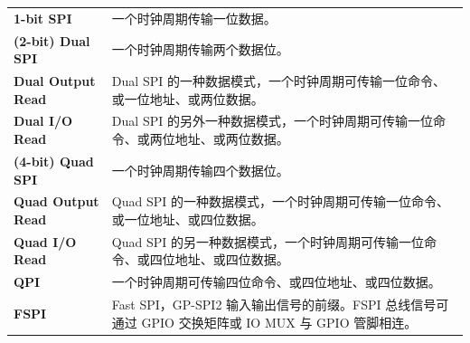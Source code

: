 \begin{longtable}[c]{ R{4cm} p{10cm} }
\textbf{1-bit SPI} & 一个时钟周期传输一位数据。\\ 
\textbf{(2-bit) Dual SPI} & 一个时钟周期传输两个数据位。\\
\textbf{Dual Output Read} & Dual SPI 的一种数据模式，一个时钟周期可传输一位命令、或一位地址、或两位数据。\\
\textbf{Dual I/O Read} & Dual SPI 的另外一种数据模式，一个时钟周期可传输一位命令、或两位地址、或两位数据。\\
\textbf{(4-bit) Quad SPI} & 一个时钟周期传输四个数据位。\\
\textbf{Quad Output Read} & Quad SPI 的一种数据模式，一个时钟周期可传输一位命令、或一位地址、或四位数据。\\
\textbf{Quad I/O Read} & Quad SPI 的另一种数据模式，一个时钟周期可传输一位命令、或四位地址、或四位数据。\\
\textbf{QPI} & 一个时钟周期可传输四位命令、或四位地址、或四位数据。\\
\textbf{FSPI} & Fast SPI，GP-SPI2 输入输出信号的前缀。FSPI 总线信号可通过 GPIO 交换矩阵或 IO MUX 与 GPIO 管脚相连。\\
\end{longtable}
